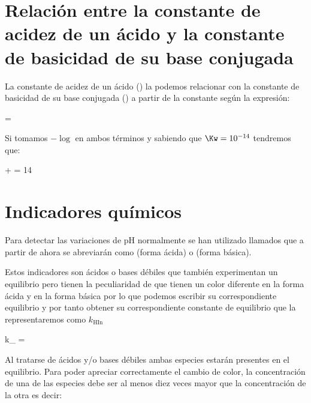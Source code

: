 \section{Relación entre la constante de acidez de un ácido y la constante de basicidad de su base conjugada}

La constante de acidez de un ácido (\Ka) la podemos relacionar con la constante de basicidad de su base conjugada (\Kb) a partir de la constante \Kw según la expresión:
\begin{centeredequation}
    \Ka \cdot \Kb = \Kw
\end{centeredequation}

Si tomamos \( -\log \) en ambos términos y sabiendo que \( \Kw = \num{e-14} \) tendremos que:
\begin{centeredequation}
    \pKa + \pKb = 14
\end{centeredequation}


\section{Indicadores químicos}\label{sec:indicadores-quimicos}

Para detectar las variaciones de pH normalmente se han utilizado  llamados  que a partir de ahora se abreviarán como  (forma ácida) o  (forma básica).

Estos indicadores son ácidos o bases débiles que también experimentan un equilibrio pero tienen la peculiaridad de que tienen un color diferente en la forma ácida  y en la forma básica  por lo que podemos escribir su correspondiente equilibrio y por tanto obtener su correspondiente constante de equilibrio que la representaremos como \(k_{\text{HIn}}\)

\begin{centeredequation}
\end{centeredequation}

\begin{centeredequation}
    k_{} = 
\end{centeredequation}

Al tratarse de ácidos y/o bases débiles ambas especies estarán presentes en el equilibrio.
Para poder apreciar correctamente el cambio de color, la concentración de una de las especies debe ser al menos diez veces mayor que la concentración de la otra es decir:

